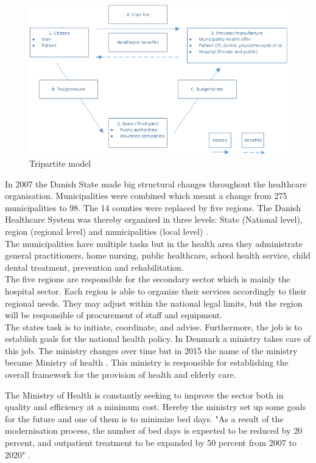 \begin{figure}[H]
\centering
\includegraphics[width=1\textwidth]{Figure/thirdpart.png}
\caption{Tripartite model \cite{sundhedsvaesen}}
\label{Trepartmodel}
\end{figure} 

In 2007 the Danish State made big structural changes throughout the healthcare organisation. Municipalities were combined which meant a change from 275 municipalities to 98. The 14 counties were replaced by five regions. The Danish Healthcare System was thereby organized in three levels: State (National level), region (regional level) and municipalities (local level) \cite{indenrigs, Healthcareindk2}.\\
The municipalities have multiple tasks but in the health area they administrate general practitioners, home nursing, public healthcare, school health service, child dental treatment, prevention and rehabilitation\cite{sundhedsministeriet}. \\
The five regions are responsible for the secondary sector which is mainly the hospital sector. Each region is able to organize their services accordingly to their regional needs. They may adjust within the national legal limits, but the region will be responsible of procurement of staff and equipment.\\
The states task is to initiate, coordinate, and advise. Furthermore, the job is to establish goals for the national health policy\cite{sundhedsministeriet}. In Denmark a ministry takes care of this job. The ministry changes over time but in 2015 the name of the ministry became Ministry of health \cite{ministryofhealth}. This ministry is responsible for establishing the overall framework for the provision of health and elderly care.

The Ministry of Health is constantly seeking to improve the sector both in quality and efficiency at a minimum cost. Hereby the ministry set up some goals for the future and one of them is to minimize bed days. "As a result of the modernisation process, the number of bed days is expected to be reduced by 20 percent, and outpatient treatment to be expanded by 50 percent from 2007 to 2020" \cite{Healthcareindk2}. %


